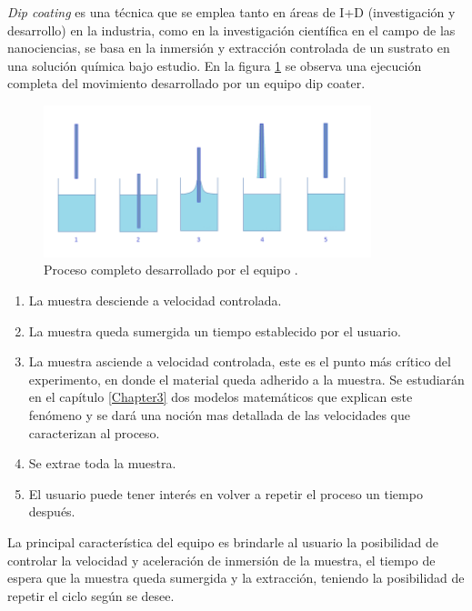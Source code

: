 \textit{Dip coating} es una técnica que se emplea tanto en áreas de I+D (investigación y desarrollo) en la industria, como en la investigación científica en el campo de las nanociencias, se basa en la inmersión y extracción  controlada de un sustrato en una solución química bajo estudio. En la figura \ref{fig:inmersion} se observa una ejecución completa del movimiento desarrollado por un equipo dip coater.


\begin{figure}[htpb]
\centering 
\includegraphics[width=0.85\textwidth]{./Figures/dip-coating.png}
\caption{Proceso completo desarrollado por el equipo \protect\footnotemark.}
\label{fig:inmersion}
\end{figure}

\begin{enumerate}
\item La muestra desciende a velocidad controlada.
\item La muestra queda sumergida un tiempo establecido por el usuario.	
\item La muestra asciende a velocidad controlada, este es el punto más crítico del experimento, en donde el material queda adherido a la muestra. Se estudiarán en el capítulo \ref{Chapter3} dos modelos matemáticos que explican este fenómeno y se dará una noción mas detallada de las velocidades que caracterizan al proceso.
\item Se extrae toda la muestra.
\item El usuario puede tener interés en volver a repetir el proceso un tiempo después.
\end{enumerate} 
 
La principal característica del equipo es brindarle al usuario la posibilidad de controlar la velocidad y aceleración de inmersión de la muestra, el tiempo de espera que la muestra queda sumergida y la extracción, teniendo la posibilidad de repetir el ciclo según se desee.

